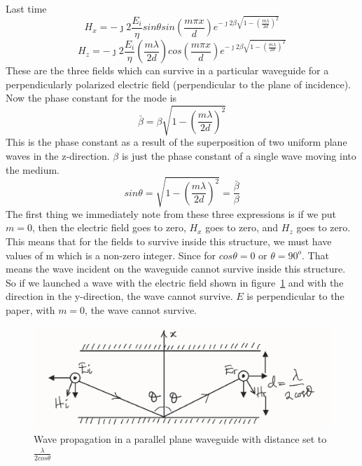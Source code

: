 Last time
\begin{dmath}
H_x = -\jmath 2\frac{E_i}{\eta}sin\theta sin\left(\frac{m\pi x}{d}\right)e^{-\jmath 2\beta\sqrt{1 - \left(\frac{m\lambda}{2d}\right)^2}}
\end{dmath}
\begin{dmath}
H_z = -\jmath 2\frac{E_i}{\eta}\left(\frac{m\lambda}{2d}\right)cos\left(\frac{m\pi x}{d}\right)e^{-\jmath 2\beta\sqrt{1 - \left(\frac{m\lambda}{2d}\right)^2}}
\end{dmath}
These are the three fields which can survive in a particular waveguide for a perpendicularly polarized electric field (perpendicular to the plane of incidence). Now the phase constant for the mode is
\begin{dmath}
\bar{\beta} = \beta\sqrt{1 - \left(\frac{m\lambda}{2d}\right)^2}
\label{eqn:phaseconst}
\end{dmath}
This is the phase constant as a result of the superposition of two uniform plane waves in the z-direction. $\beta$ is just the phase constant of a single wave moving into the medium.
\begin{dmath}
sin\theta = \sqrt{1-\left(\frac{m\lambda}{2d}\right)^2} 
=\frac{\bar{\beta}}{\beta}
\end{dmath}
The first thing we immediately note from these three expressions is if we put $m=0$, then the electric field goes to zero, $H_x$ goes to zero, and $H_z$ goes to zero. This means that for the fields to survive inside this structure, we must have values of m which is a non-zero integer. Since for $cos\theta = 0$ or $\theta = 90^o$. That means the wave incident on the waveguide cannot survive inside this structure. So if we launched a wave with the electric field shown in figure~\ref{fig:lec35fig6} and with the direction in the y-direction, the wave cannot survive. $E$ is perpendicular to the paper, with $m=0$, the wave cannot survive. 
\begin{figure}[h]
\centering
\includegraphics[width=1\linewidth]{./graphics/lec35fig6}
\caption{Wave propagation in a parallel plane waveguide with distance set to $\frac{\lambda}{2cos\theta}$}
\label{fig:lec35fig6}
\end{figure}
